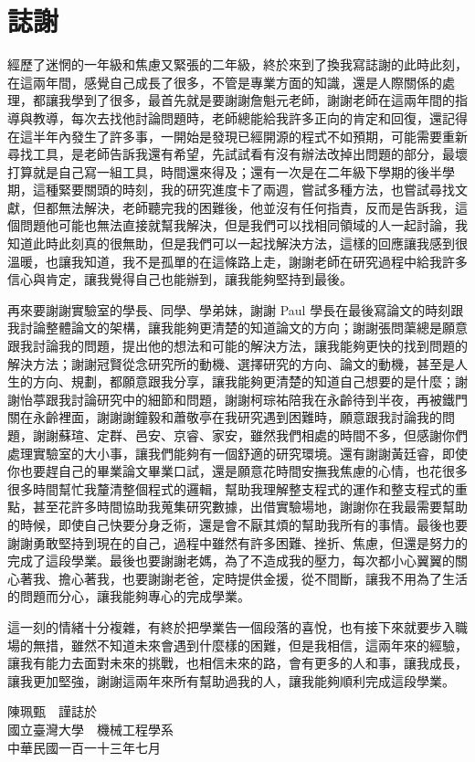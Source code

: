 \chapter{誌謝}
    \fontsize{12pt}{18pt}\selectfont
    經歷了迷惘的一年級和焦慮又緊張的二年級，終於來到了換我寫誌謝的此時此刻，在這兩年間，感覺自己成長了很多，不管是專業方面的知識，還是人際關係的處理，都讓我學到了很多，最首先就是要謝謝詹魁元老師，謝謝老師在這兩年間的指導與教導，每次去找他討論問題時，老師總能給我許多正向的肯定和回復，還記得在這半年內發生了許多事，一開始是發現已經開源的程式不如預期，可能需要重新尋找工具，是老師告訴我還有希望，先試試看有沒有辦法改掉出問題的部分，最壞打算就是自己寫一組工具，時間還來得及；還有一次是在二年級下學期的後半學期，這種緊要關頭的時刻，我的研究進度卡了兩週，嘗試多種方法，也嘗試尋找文獻，但都無法解決，老師聽完我的困難後，他並沒有任何指責，反而是告訴我，這個問題他可能也無法直接就幫我解決，但是我們可以找相同領域的人一起討論，我知道此時此刻真的很無助，但是我們可以一起找解決方法，這樣的回應讓我感到很溫暖，也讓我知道，我不是孤單的在這條路上走，謝謝老師在研究過程中給我許多信心與肯定，讓我覺得自己也能辦到，讓我能夠堅持到最後。

    再來要謝謝實驗室的學長、同學、學弟妹，謝謝 Paul 學長在最後寫論文的時刻跟我討論整體論文的架構，讓我能夠更清楚的知道論文的方向；謝謝張問蕖總是願意跟我討論我的問題，提出他的想法和可能的解決方法，讓我能夠更快的找到問題的解決方法；謝謝冠賢從念研究所的動機、選擇研究的方向、論文的動機，甚至是人生的方向、規劃，都願意跟我分享，讓我能夠更清楚的知道自己想要的是什麼；謝謝怡葶跟我討論研究中的細節和問題，謝謝柯琮祐陪我在永齡待到半夜，再被鐵門關在永齡裡面，謝謝謝鐘毅和蕭敬亭在我研究遇到困難時，願意跟我討論我的問題，謝謝蘇瑄、定群、邑安、京睿、家安，雖然我們相處的時間不多，但感謝你們處理實驗室的大小事，讓我們能夠有一個舒適的研究環境。還有謝謝黃廷睿，即使你也要趕自己的畢業論文畢業口試，還是願意花時間安撫我焦慮的心情，也花很多很多時間幫忙我釐清整個程式的邏輯，幫助我理解整支程式的運作和整支程式的重點，甚至花許多時間協助我蒐集研究數據，出借實驗場地，謝謝你在我最需要幫助的時候，即使自己快要分身乏術，還是會不厭其煩的幫助我所有的事情。最後也要謝謝勇敢堅持到現在的自己，過程中雖然有許多困難、挫折、焦慮，但還是努力的完成了這段學業。最後也要謝謝老媽，為了不造成我的壓力，每次都小心翼翼的關心著我、擔心著我，也要謝謝老爸，定時提供金援，從不間斷，讓我不用為了生活的問題而分心，讓我能夠專心的完成學業。
    
    這一刻的情緒十分複雜，有終於把學業告一個段落的喜悅，也有接下來就要步入職場的無措，雖然不知道未來會遇到什麼樣的困難，但是我相信，這兩年來的經驗，讓我有能力去面對未來的挑戰，也相信未來的路，會有更多的人和事，讓我成長，讓我更加堅強，謝謝這兩年來所有幫助過我的人，讓我能夠順利完成這段學業。

    \begin{flushright}
        陳珮甄　謹誌於\\
        國立臺灣大學　機械工程學系\\
        中華民國一百一十三年七月
    \end{flushright}
 
